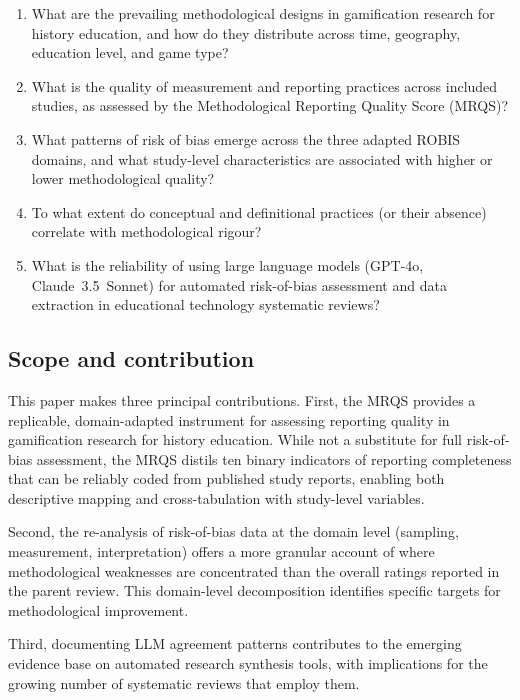 \documentclass[etq]{acnsart}
\begin{document}
	\begin{enumerate}[label=RQ\arabic*:,leftmargin=*]
		\item What are the prevailing methodological designs in gamification research for history education, and how do they distribute across time, geography, education level, and game type?
		\item What is the quality of measurement and reporting practices across included studies, as assessed by the Methodological Reporting Quality Score (MRQS)?
		\item What patterns of risk of bias emerge across the three adapted ROBIS domains, and what study-level characteristics are associated with higher or lower methodological quality?
		\item To what extent do conceptual and definitional practices (or their absence) correlate with methodological rigour?
		\item What is the reliability of using large language models (GPT-4o, Claude~3.5~Sonnet) for automated risk-of-bias assessment and data extraction in educational technology systematic reviews?
	\end{enumerate}
	
	\subsection{Scope and contribution}
	\label{sec:intro_contribution}
	
	This paper makes three principal contributions. First, the MRQS provides a replicable, domain-adapted instrument for assessing reporting quality in gamification research for history education. While not a substitute for full risk-of-bias assessment, the MRQS distils ten binary indicators of reporting completeness that can be reliably coded from published study reports, enabling both descriptive mapping and cross-tabulation with study-level variables.
	
	Second, the re-analysis of risk-of-bias data at the domain level (sampling, measurement, interpretation) offers a more granular account of where methodological weaknesses are concentrated than the overall ratings reported in the parent review. This domain-level decomposition identifies specific targets for methodological improvement.
	
	Third, documenting LLM agreement patterns contributes to the emerging evidence base on automated research synthesis tools, with implications for the growing number of systematic reviews that employ them.
	
\end{document}
